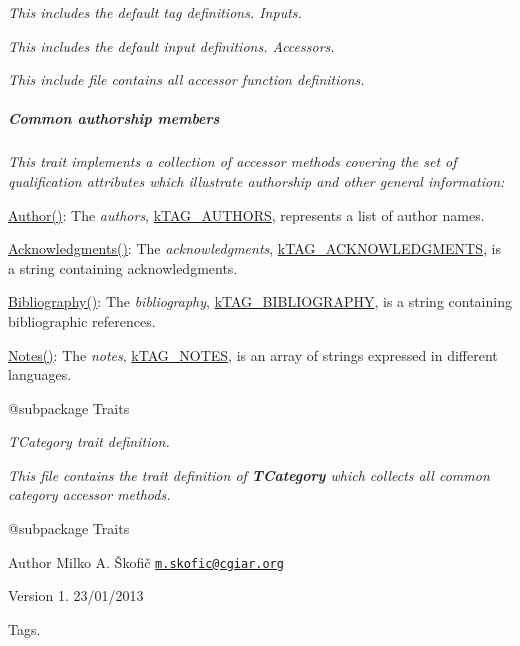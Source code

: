 {\itshape This includes the default tag definitions. Inputs.}

{\itshape This includes the default input definitions. Accessors.}

{\itshape This include file contains all accessor function definitions. \subparagraph*{Common authorship members}}

{\itshape }

{\itshape This trait implements a collection of accessor methods covering the set of qualification attributes which illustrate authorship and other general information\-:}

{\itshape 
\begin{DoxyItemize}
\item {\ttfamily \hyperlink{}{Author()}}\-: The {\itshape authors}, \hyperlink{}{k\-T\-A\-G\-\_\-\-A\-U\-T\-H\-O\-R\-S}, represents a list of author names. 
\item {\ttfamily \hyperlink{}{Acknowledgments()}}\-: The {\itshape acknowledgments}, \hyperlink{}{k\-T\-A\-G\-\_\-\-A\-C\-K\-N\-O\-W\-L\-E\-D\-G\-M\-E\-N\-T\-S}, is a string containing acknowledgments. 
\item {\ttfamily \hyperlink{}{Bibliography()}}\-: The {\itshape bibliography}, \hyperlink{}{k\-T\-A\-G\-\_\-\-B\-I\-B\-L\-I\-O\-G\-R\-A\-P\-H\-Y}, is a string containing bibliographic references. 
\item {\ttfamily \hyperlink{}{Notes()}}\-: The {\itshape notes}, \hyperlink{}{k\-T\-A\-G\-\_\-\-N\-O\-T\-E\-S}, is an array of strings expressed in different languages. 
\end{DoxyItemize}}

{\itshape \begin{DoxyVerb} @subpackage        Traits\end{DoxyVerb}
}

{\itshape {\itshape T\-Category} trait definition.}

{\itshape This file contains the trait definition of {\bfseries T\-Category} which collects all common category accessor methods.}

{\itshape \begin{DoxyVerb} @subpackage        Traits
\end{DoxyVerb}
}

{\itshape \begin{DoxyAuthor}{Author}
Milko A. Škofič \href{mailto:m.skofic@cgiar.org}{\tt m.\-skofic@cgiar.\-org} 
\end{DoxyAuthor}
\begin{DoxyVersion}{Version}
1. 23/01/2013
\end{DoxyVersion}
Tags.}

